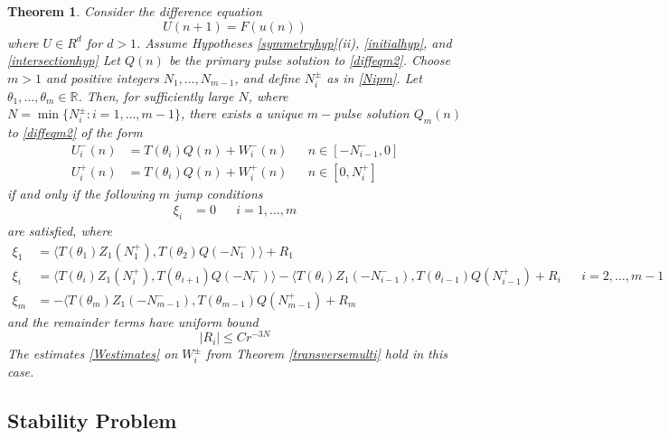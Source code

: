 \documentclass[12pt]{article}
\def\R{{\mathbb R}}
\newtheorem{theorem}{Theorem}
\begin{document}
\begin{theorem}\label{ntmulti}
Consider the difference equation
\begin{equation}\label{diffeqm2}
U(n+1) = F(u(n))
\end{equation}
where $U \in R^d$ for $d > 1$. Assume Hypotheses \ref{symmetryhyp}(ii), \ref{initialhyp}, and \ref{intersectionhyp} Let $Q(n)$ be the primary pulse solution to \eqref{diffeqm2}. Choose $m > 1$ and positive integers $N_1, \dots, N_{m-1}$, and define $N_i^\pm$ as in \eqref{Nipm}. Let $\theta_1, \dots, \theta_m \in \R$. Then, for sufficiently large $N$, where $N = \min\{ N_i^\pm : i = 1, \dots, m-1 \}$, there exists a unique $m-$pulse solution $Q_m(n)$ to \eqref{diffeqm2} of the form
\begin{align}
U_i^-(n) &= T(\theta_i) Q(n) + W_i^-(n) && n \in [-N_{i-1}^-, 0] \\
U_i^+(n) &= T(\theta_i) Q(n) + W_i^+(n) && n \in [0, N_i^+]
\end{align}
if and only if the following $m$ jump conditions 
\begin{align*}
\xi_i &= 0 && i = 1, \dots, m
\end{align*}
are satisfied, where
\begin{equation}\label{jumpZ}
\begin{aligned}
\xi_1 &= \langle T(\theta_1) Z_1(N_1^+), T(\theta_2) Q(-N_1^-) \rangle + R_1  \\
\xi_i &= \langle T(\theta_i) Z_1(N_i^+), T(\theta_{i+1}) Q(-N_i^-) \rangle
- \langle T(\theta_i) Z_1(-N_{i-1}^-), T(\theta_{i-1}) Q(N_{i-1}^+) + R_i &&
i = 2, \dots, m-1 \\
\xi_m &= -\langle T(\theta_m) Z_1(-N_{m-1}^-), T(\theta_{m-1}) Q(N_{m-1}^+) + R_m
\end{aligned}
\end{equation}
and the remainder terms have uniform bound
\[
|R_i| \leq C r^{-3N}
\]
The estimates \eqref{Westimates} on $W_i^\pm$ from Theorem \ref{transversemulti} hold in this case.
\end{theorem}

\subsection{Stability Problem}
\end{document}
